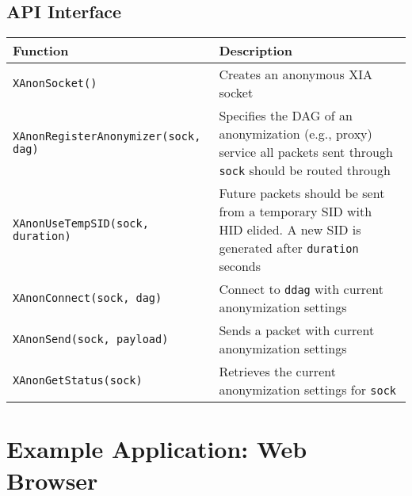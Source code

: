 \documentclass[11pt]{article}
\begin{document}
\subsection{API Interface}
\label{sec:api-interface}

\begin{center}
	\begin{tabular}{l p{7cm}}
	\textbf{Function} 	&	\textbf{Description}\\
	\hline
	\texttt{XAnonSocket()} & Creates an anonymous XIA socket\\
	\texttt{XAnonRegisterAnonymizer(sock, dag)} & Specifies the DAG of an anonymization (e.g., proxy) service all packets sent through \texttt{sock} should be routed through\\
	\texttt{XAnonUseTempSID(sock, duration)} & Future packets should be sent from a temporary SID with HID elided. A new SID is generated after \texttt{duration} seconds\\
	\texttt{XAnonConnect(sock, dag)} & Connect to \texttt{ddag} with current anonymization settings\\
	\texttt{XAnonSend(sock, payload)} & Sends a packet with current anonymization settings\\
	\texttt{XAnonGetStatus(sock)} & Retrieves the current anonymization settings for \texttt{sock}\\
	\hline
	\end{tabular}
\end{center}


\section{Example Application: Web Browser}
\end{document}
